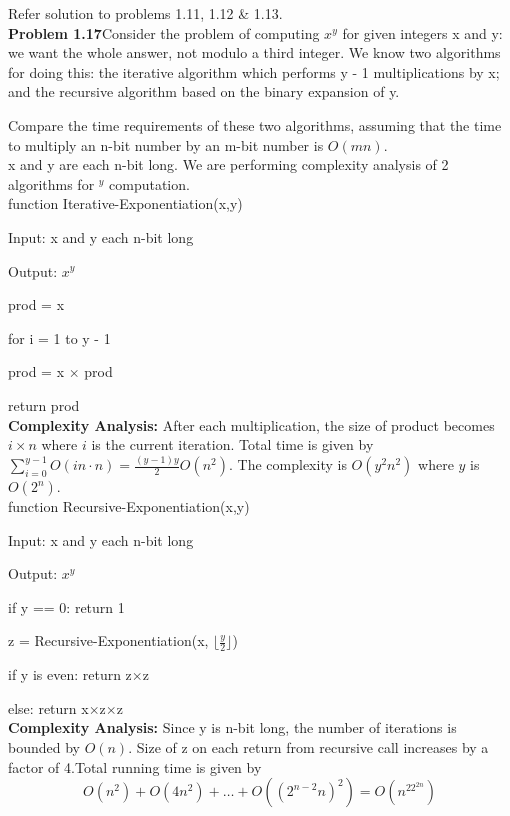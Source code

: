\documentclass[11pt]{article}
\begin{document}
	Refer solution to problems 1.11, 1.12 \& 1.13.\\
	
	\textbf{Problem 1.17}Consider the problem of computing $x^y$ for given integers x and y: we want the whole answer, not modulo a third integer. We know two algorithms for doing this: the iterative algorithm which performs y - 1 multiplications by x; and the
	recursive algorithm based on the binary expansion of y.
	
	Compare the time requirements of these two algorithms, assuming that the time to multiply an n-bit number by an m-bit number is $O(mn)$.\\
	
	x and y are each n-bit long. We are performing complexity analysis of 2 algorithms for $^y$ computation.\\
	
	function  Iterative-Exponentiation(x,y)
	
	Input:  x and y each n-bit long
	
	Output: $x^y$
	
	prod = x
	
	for i = 1 to y - 1
	
	\hspace{0.25in} prod = x $\times$ prod
	
	return prod\\
	
	\textbf{Complexity Analysis:} After each multiplication, the size of product becomes $i\times n$ where $i$ is the current iteration. Total time is given by $\sum_{i = 0}^{y-1}O(in\cdot n) = \frac{(y-1)y}{2}O(n^2)$. The complexity is $O(y^2n^2)$ where $y$ is $O(2^n)$.\\
	
	function  Recursive-Exponentiation(x,y)
	
	Input:  x and y each n-bit long
	
	Output: $x^y$
	
	if y == 0: return 1
	
	z = Recursive-Exponentiation(x, $\lfloor \frac{y}{2} \rfloor$)
	
	if y is even: return z$\times$z
	
	else: return x$\times$z$\times$z\\
	
	\textbf{Complexity Analysis:} Since y is n-bit long, the number of iterations is bounded	by $O(n)$. Size of z on each return from recursive call increases by a factor of 4.Total running time is given by
	$$O(n^2) + O(4n^2)+ \dots + O((2^{n-2}n)^2) = O(n^22^{2n})$$
	
\end{document}
